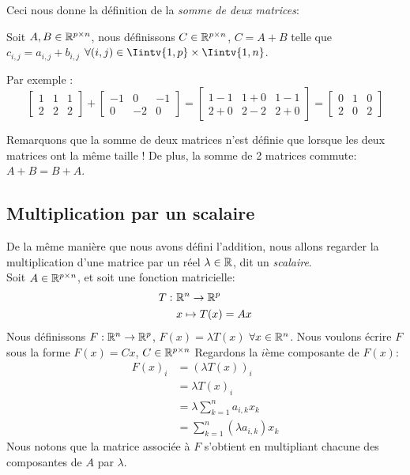 \noindent Ceci nous donne la définition de la \textit{somme de deux matrices}:
\begin{boxdef}
\noindent Soit $A,B \in \mathbb{R}^{p \times n}$, nous définissons $C \in \mathbb{R}^{p \times n}$, $C = A+B$ telle que $c_{i,j} = a_{i,j}+b_{i,j}$ $\forall (i,j) \in \Iintv{1,p} \times \Iintv{1, n}$.
\end{boxdef}
Par exemple :
$$\begin{bmatrix} 1 & 1 & 1 \\ 2 & 2 & 2 \end{bmatrix} + \begin{bmatrix} -1 & 0 & -1 \\ 0 & -2 & 0 \end{bmatrix} = \begin{bmatrix} 1-1 & 1+0 & 1-1 \\ 2+0 & 2-2 & 2+0 \end{bmatrix} = \begin{bmatrix} 0 & 1 & 0 \\ 2 & 0 & 2 \end{bmatrix}
$$

\noindent Remarquons que la somme de deux matrices n'est définie que lorsque les deux matrices ont la même taille ! De plus, la somme de 2 matrices commute: $A+B = B+A$.

\subsection{Multiplication par un scalaire}
\noindent De la même manière que nous avons défini l'addition, nous allons regarder la multiplication d'une matrice par un réel $\lambda \in \mathbb{R}$, dit un \textit{scalaire}. \\

\noindent Soit $A\in \mathbb{R}^{p \times n}$, et soit une fonction matricielle:
\begin{align*}
    T: \ &\mathbb{R}^n \to \mathbb{R}^p\\
    &x \mapsto T(x) = Ax
\end{align*}
Nous définissons $F: \mathbb{R}^n \to \mathbb{R}^p$, $F(x) = \lambda T(x)$ $\forall x \in \mathbb{R}^n$. Nous voulons écrire $F$ sous la forme $F(x) = Cx$, $C \in \mathbb{R}^{p \times n}$ Regardons la $i$ème composante de $F(x)$:
\begin{align*}
    F(x)_i &= (\lambda T(x))_i \\
    &= \lambda T(x)_i \\
    &= \lambda \sum_{k=1}^{n} a_{i,k} x_k \\
    &= \sum_{k=1}^{n} (\lambda a_{i,k}) x_k
\end{align*}
Nous notons que la matrice associée à $F$ s'obtient en multipliant chacune des composantes de $A$ par $\lambda$.\\

